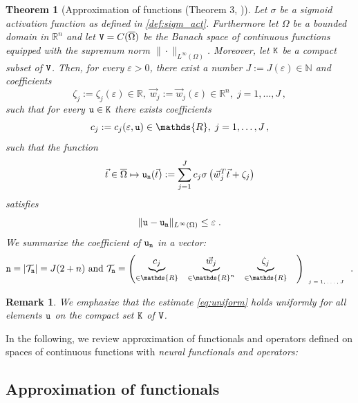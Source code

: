 \documentclass[10pt]{article}
\numberwithin{equation}{section}
\newtheorem{theorem}[theorem]{Theorem}
\newtheorem{remark}[remark]{Remark}
\theoremstyle{nonumberplain}
\newcommand{\N}{\mathds{N}}
\newcommand{\R}{\mathds{R}}
\newcommand{\abs}[1]{\left|#1\right|}
\newcommand{\norms}[1]{\|#1\|}
\newcommand{\ve}{\varepsilon}
\newcommand{\bt}{\vec{t}}
\newcommand{\bw}{{\vec{w}}}
\newcommand{\V}{{\tt V}}
\newcommand{\n}{{\tt n}}
\begin{document}
\begin{theorem}[Approximation of functions (Theorem 3, \cite{TiaHon95})] \label{th:function apx} 
	Let $\sigma$ be a  sigmoid activation function as defined in \autoref{def:sigm_act}. Furthermore let $\Omega$ be a bounded domain in $\R^n$ and let $\V=C(\overline{\Omega})$ be the Banach space of continuous functions equipped with the supremum norm $\norms{\cdot}_{L^\infty(\Omega)}$. Moreover, let ${\tt K}$ be a compact subset of $\V$.
	Then, for every $\ve >0$, there exist a number $J := J(\ve) \in \N$ and coefficients 
	$$\zeta_j := \zeta_j(\ve) \in \R, \; \bw_j:=\bw_j(\ve) \in \R^n, \; j = 1,\dots,J\,,$$ 
	such that for every ${\tt u} \in {\tt K}$ there exists coefficients 
	$$c_j := c_j(\ve,{\tt u}) \in \R, \; j = 1,\dots,J\,,$$ 
	such that the function
	\begin{equation*}
		\bt \in \overline{\Omega} \mapsto 
		{\tt u}_\n(\bt):=\sum_{j=1}^{J} c_j\sigma\left(\bw_j^T\bt + \zeta_j\right)
	\end{equation*}
	satisfies  
	\begin{equation}\label{eq:uniform}
	\norms{{\tt u}-{\tt u}_\n}_{L^\infty(\Omega)} \leq \ve\;.
	\end{equation}
	We summarize the coefficient of ${\tt u}_\n$ in a vector:
	\begin{equation*}
		\n =\abs{\mathcal{T_\n}} = J(2+n)
		\text{ and }
		\mathcal{T}_\n = \begin{pmatrix} \underbrace{ c_{j}}_{\in \R} & \underbrace{ \bw_j}_{\in \R^n} & \underbrace{ \zeta_j}_{\in \R} &\end{pmatrix}_{\tiny \begin{array}{c} j=1,\dots,J\end{array}}.
	\end{equation*}
\end{theorem}
\begin{remark}
 We emphasize that the estimate \autoref{eq:uniform} holds uniformly for all elements ${\tt u}$ on the compact set ${\tt K}$ of $\V$.
\end{remark}


In the following, we review approximation of functionals and operators defined on spaces of continuous functions with \emph{neural functionals and operators:}
\subsection{Approximation of functionals}
\end{document}
